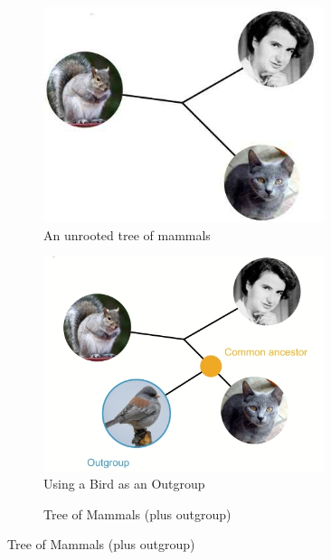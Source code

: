 \documentclass[]{article}
\begin{document}
\begin{figure}[H]
	\caption{Adding an Outgroup to the Tree of Mammals}
	\begin{subfigure}[t]{0.3\textwidth}
		\caption{An unrooted tree of mammals}\label{fig:bird:without:outgroup}
		\includegraphics[width=0.9\textwidth]{WithoutOutgroup}
	\end{subfigure}
	\begin{subfigure}[t]{0.3\textwidth}
		\caption{Using a Bird as an Outgroup}\label{fig:bird:outgroup}
		\includegraphics[width=0.9\textwidth]{Outgroup}
	\end{subfigure}
	\begin{subfigure}[t]{0.3\textwidth}
		\caption{Tree of Mammals (plus outgroup)}\label{fig:bird-mammals}

\end{subfigure}
\end{figure}
\end{document}
